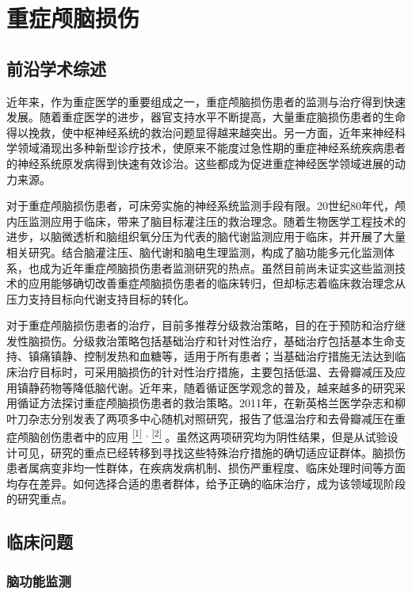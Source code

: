 \chapter{重症颅脑损伤}

\section{前沿学术综述}

近年来，作为重症医学的重要组成之一，重症颅脑损伤患者的监测与治疗得到快速发展。随着重症医学的进步，器官支持水平不断提高，大量重症脑损伤患者的生命得以挽救，使中枢神经系统的救治问题显得越来越突出。另一方面，近年来神经科学领域涌现出多种新型诊疗技术，使原来不能度过急性期的重症神经系统疾病患者的神经系统原发病得到快速有效诊治。这些都成为促进重症神经医学领域进展的动力来源。

对于重症颅脑损伤患者，可床旁实施的神经系统监测手段有限。20世纪80年代，颅内压监测应用于临床，带来了脑目标灌注压的救治理念。随着生物医学工程技术的进步，以脑微透析和脑组织氧分压为代表的脑代谢监测应用于临床，并开展了大量相关研究。结合脑灌注压、脑代谢和脑电生理监测，构成了脑功能多元化监测体系，也成为近年重症颅脑损伤患者监测研究的热点。虽然目前尚未证实这些监测技术的应用能够确切改善重症颅脑损伤患者的临床转归，但却标志着临床救治理念从压力支持目标向代谢支持目标的转化。

对于重症颅脑损伤患者的治疗，目前多推荐分级救治策略，目的在于预防和治疗继发性脑损伤。分级救治策略包括基础治疗和针对性治疗，基础治疗包括基本生命支持、镇痛镇静、控制发热和血糖等，适用于所有患者；当基础治疗措施无法达到临床治疗目标时，可采用脑损伤的针对性治疗措施，主要包括低温、去骨瓣减压及应用镇静药物等降低脑代谢。近年来，随着循证医学观念的普及，越来越多的研究采用循证方法探讨重症颅脑损伤患者的救治策略。2011年，在新英格兰医学杂志和柳叶刀杂志分别发表了两项多中心随机对照研究，报告了低温治疗和去骨瓣减压在重症颅脑创伤患者中的应用
\protect\hyperlink{text00029.htmlux5cux23ch1-28}{\textsuperscript{{[}1{]}}}
\textsuperscript{,}
\protect\hyperlink{text00029.htmlux5cux23ch2-28}{\textsuperscript{{[}2{]}}}
。虽然这两项研究均为阴性结果，但是从试验设计可见，研究的重点已经转移到寻找这些特殊治疗措施的确切适应证群体。脑损伤患者属病变非均一性群体，在疾病发病机制、损伤严重程度、临床处理时间等方面均存在差异。如何选择合适的患者群体，给予正确的临床治疗，成为该领域现阶段的研究重点。

\section{临床问题}

\subsection{脑功能监测}

